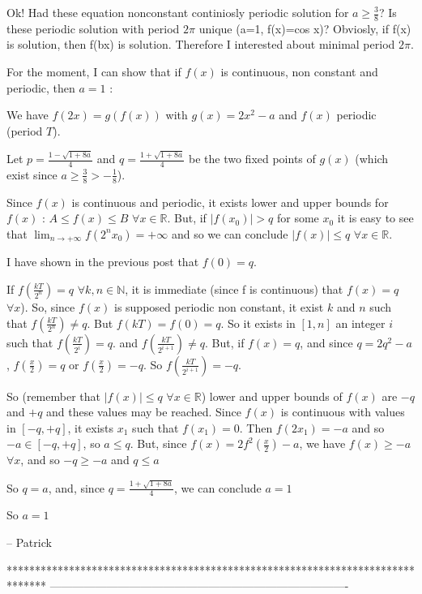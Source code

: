 \begin{mysolution}
	\begin{tcolorbox}Ok!
Had these equation nonconstant continiosly periodic solution for $a\ge \frac{3}{8}$?
Is these periodic solution with period $2\pi$ unique (a=1, f(x)=cos x)?
Obviosly, if f(x) is solution, then f(bx) is solution. Therefore I interested about minimal period $2\pi$.\end{tcolorbox}

For the moment, I can show that if $f(x)$ is continuous, non constant and periodic, then $a=1$ :

We have $f(2x)=g(f(x))$ with $g(x)=2x^{2}-a$ and $f(x)$ periodic (period $T$).

Let $p=\frac{1-\sqrt{1+8a}}{4}$ and $q=\frac{1+\sqrt{1+8a}}{4}$ be the two fixed points of $g(x)$ (which exist since $a\geq\frac{3}{8}>-\frac{1}{8}$). 

Since $f(x)$ is continuous and periodic, it exists lower and upper bounds for $f(x)$ : $A\leq f(x)\leq B$ $\forall x\in \mathbb{R}$. But, if $|f(x_{0})|>q$ for some $x_{0}$ it is easy to see that $\lim_{n\rightarrow+\infty}f(2^{n}x_{0})=+\infty$ and so we can conclude $|f(x)|\leq q$ $\forall x\in \mathbb{R}$.

I have shown in the previous post that $f(0)=q$.

If $f(\frac{kT}{2^{n}})=q$ $\forall k,n\in\mathbb{N}$, it is immediate (since f is continuous) that $f(x)=q$ $\forall x$). So, since $f(x)$ is supposed periodic non constant, it exist $k$ and $n$ such that $f(\frac{kT}{2^{n}})\neq q$. But $f(kT)=f(0)=q$. So it exists in $[1,n]$ an integer $i$ such that $f(\frac{kT}{2^{i}})= q$. and $f(\frac{kT}{2^{i+1}})\neq q$. But, if $f(x)=q$, and since $q=2q^{2}-a$, $f(\frac{x}{2})=q$ or $f(\frac{x}{2})=-q$. So $f(\frac{kT}{2^{i+1}})=-q$.

So (remember that $|f(x)|\leq q$ $\forall x\in \mathbb{R}$) lower and upper bounds of $f(x)$ are $-q$ and $+q$ and these values may be reached.
Since $f(x)$ is continuous with values in $[-q,+q]$, it exists $x_{1}$ such that $f(x_{1})=0$. Then $f(2x_{1})=-a$ and so $-a\in[-q,+q]$, so $a\leq q$.
But, since $f(x)=2f^{2}(\frac{x}{2})-a$, we have $f(x)\geq-a$ $\forall x$, and so $-q\geq-a$ and $q\leq a$

So $q=a$, and, since $q=\frac{1+\sqrt{1+8a}}{4}$, we can conclude $a=1$

So $a=1$

-- 
Patrick
\end{mysolution}
*******************************************************************************
-------------------------------------------------------------------------------

